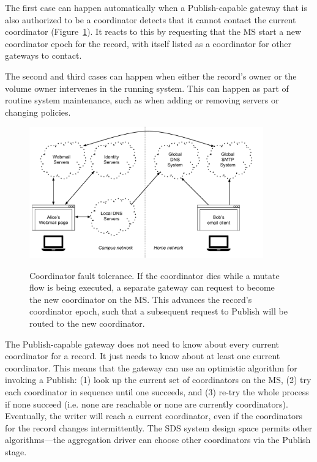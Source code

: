 The first case can happen automatically when a Publish-capable gateway that is
also authorized to be a coordinator detects that it cannot contact the
current coordinator (Figure~\ref{fig:chap2-coordinator-change}).  It reacts to this by requesting that the MS start
a new coordinator epoch for the record, with itself listed as a coordinator for other gateways to contact.

The second and third cases can happen when either the record's owner or the
volume owner intervenes in the running system.  This can happen as part of routine system
maintenance, such as when adding or removing servers or changing
policies.

\begin{figure}[h!]
   \caption{Coordinator fault tolerance.  If the coordinator dies while a mutate
   flow is being executed, a separate gateway can request to become the new
   coordinator on the MS.  This advances the record's coordinator epoch, such
   that a subsequent request to Publish will be routed to the new coordinator.}
   \centering
   \includegraphics[width=0.9\textwidth,page=11]{figures/dissertation-figures}
   \label{fig:chap2-coordinator-change}
\end{figure}

The Publish-capable gateway does not need to know
about every current coordinator for a record.  It just needs to know about
at least one current coordinator.  This means that the gateway can use an
optimistic algorithm for invoking a Publish: 
(1) look up the current set of coordinators on the MS, (2) try each coordinator in
sequence until one succeeds, and (3) re-try the whole process if none
succeed (i.e. none are reachable or none are currently coordinators).
Eventually, the writer will reach a current coordinator, even if the
coordinators for the record changes intermittently.  The SDS system design space
permits other algorithms---the aggregation driver can choose other coordinators
via the Publish stage.

